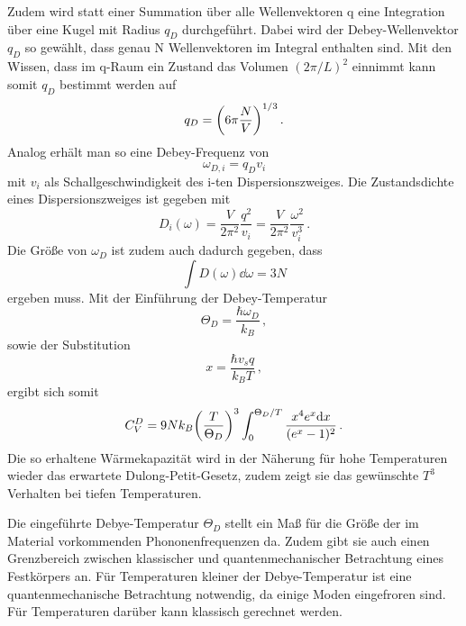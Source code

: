 Zudem wird statt einer Summation über alle Wellenvektoren q eine Integration über eine Kugel mit Radius $q_D$ durchgeführt. Dabei wird der Debey-Wellenvektor $q_D$ so gewählt, dass genau N Wellenvektoren im Integral enthalten sind.
Mit den Wissen, dass im q-Raum  ein Zustand das Volumen $(2\pi/L)^2$ einnimmt kann somit $q_D$ bestimmt werden auf
\begin{equation}
	q_D = \qty(6\pi \frac{N}{V})^{1/3} \,.
	\label{eq:D-q}
\end{equation}
Analog erhält man so eine Debey-Frequenz von
\begin{equation}
	\omega_{D,i} = q_D v_i
	\label{eq:D-Freg}
\end{equation}
mit $v_i$ als Schallgeschwindigkeit des i-ten Dispersionszweiges. 
Die Zustandsdichte eines Dispersionszweiges ist gegeben mit
\begin{equation}
	D_i(\omega)= \frac{V}{2\pi^2}\frac{q^2}{v_i} =   \frac{V}{2\pi^2}\frac{\omega^2}{v_i^3} \,.
	\label{eq:D-Disp}
\end{equation}
Die Größe von $\omega_D$ ist zudem auch dadurch gegeben, dass
\begin{equation}
	\int D(\omega) \dd\omega = 3 N
	\label{eq:}
\end{equation}
ergeben muss.
Mit der Einführung der Debey-Temperatur
\begin{equation}
	\Theta_D = \frac{\hbar\omega_D}{k_B} \,,
	\label{eq:D-Temp}
\end{equation}
sowie der Substitution
\begin{equation}
	x=\frac{\hbar v_s q}{k_B T} \,,
\end{equation}
ergibt sich somit 
\begin{equation}
	C_V^D = 9Nk_B \qty(\frac{T}{\Theta_D})^3 \int_0^{\Theta_D/T} \frac{x^4e^x \dd x}{(e^x-1)^2} \,.
\end{equation}
Die so erhaltene Wärmekapazität wird in der Näherung für hohe Temperaturen wieder das erwartete Dulong-Petit-Gesetz, zudem zeigt sie das gewünschte $T^3$ Verhalten bei tiefen Temperaturen.

Die eingeführte Debye-Temperatur $\Theta_D$ stellt ein Maß für die Größe der im Material vorkommenden Phononenfrequenzen da. Zudem gibt sie auch einen Grenzbereich zwischen klassischer und quantenmechanischer Betrachtung eines Festkörpers an. Für Temperaturen kleiner der Debye-Temperatur ist eine quantenmechanische Betrachtung notwendig, da einige Moden eingefroren sind. Für Temperaturen darüber kann klassisch gerechnet werden.